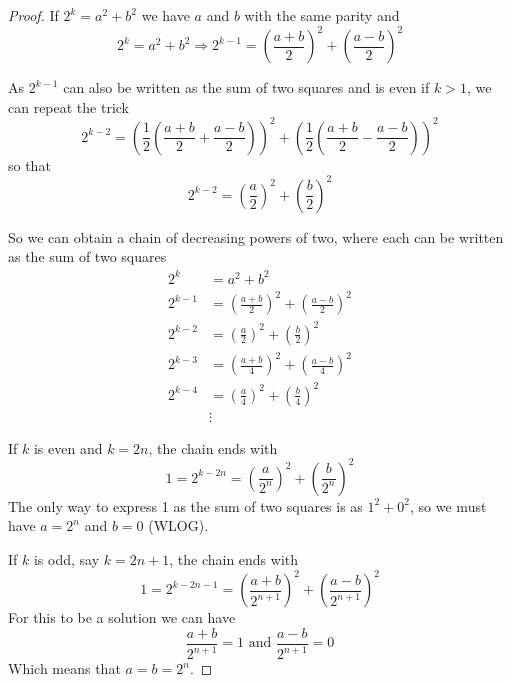\documentclass[11pt]{amsart}
\begin{document}
\begin{proof}

If $2^{k} = a^{2} + b^{2}$ we have $a$ and $b$ with the same parity and 
$$
2^{k} = a^{2} + b^{2} \Rightarrow
2^{k-1} = \left(\frac{a+b}{2}\right)^2 + \left(\frac{a-b}{2}\right)^2
$$

As $2^{k-1}$ can also be written as the sum of two squares and is even if $k>1$, we can repeat the trick
$$
2^{k-2} = 
\left(\frac{1}{2} \left(
\frac{a+b}{2} + \frac{a-b}{2}
\right)\right)^2
+
\left(\frac{1}{2} \left(
\frac{a+b}{2} - \frac{a-b}{2}
\right)\right)^2
$$
so that
$$
2^{k-2} = 
\left(\frac{a}{2}\right)^2
+
\left(\frac{b}{2}\right)^2
$$

So we can obtain a chain of decreasing powers of two, where each can be written as the sum of two squares
$$
\begin{aligned}
2^{k} &= a^{2} + b^{2} 
\\
2^{k-1} &= 
\left(\frac{a+b}{2}\right)^2 + 
\left(\frac{a-b}{2}\right)^2 
\\
2^{k-2} &= 
\left(\frac{a}{2}\right)^2
+
\left(\frac{b}{2}\right)^2
\\
2^{k-3} &= 
\left(\frac{a+b}{4}\right)^2 + 
\left(\frac{a-b}{4}\right)^2 
\\
2^{k-4} &= 
\left(\frac{a}{4}\right)^2
+
\left(\frac{b}{4}\right)^2
\\
&\vdots
\end{aligned}
$$

If $k$ is even and $k=2n$, the chain ends 
with
$$
1 = 2^{k-2n} = 
\left(\frac{a}{2^{n}}\right)^2
+
\left(\frac{b}{2^{n}}\right)^2
$$
The only way to express 1 as the sum of two squares is as $1^{2} + 0^{2}$, so we must have $a = 2^{n}$ and $b = 0$ (WLOG).

If $k$ is odd, say $k=2n+1$, the chain ends
with
$$
1 = 2^{k-2n-1} = 
\left(\frac{a+b}{2^{n+1}}\right)^2 + 
\left(\frac{a-b}{2^{n+1}}\right)^2 
$$
For this to be a solution we can have
$$
\frac{a+b}{2^{n+1}} = 1 \text{ and } 
\frac{a-b}{2^{n+1}} = 0
$$
Which means that $a = b = 2^{n}$.

\end{proof}
\end{document}
